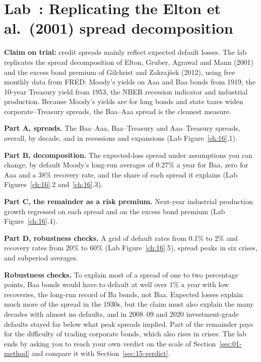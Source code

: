 \section{Lab~\thechapter: Replicating the Elton et al.\ (2001) spread decomposition}
\label{sec:15-lab}

\textbf{Claim on trial:} credit spreads mainly reflect expected default losses. The lab replicates the spread decomposition of Elton, Gruber, Agrawal and Mann (2001) and the excess bond premium of Gilchrist and Zakraj\v{s}ek (2012), using free monthly data from FRED: Moody's yields on Aaa and Baa bonds from 1919, the 10-year Treasury yield from 1953, the NBER recession indicator and industrial production. Because Moody's yields are for long bonds and state taxes widen corporate--Treasury spreads, the Baa--Aaa spread is the cleanest measure.

\textbf{Part A, spreads.} The Baa--Aaa, Baa--Treasury and Aaa--Treasury spreads, overall, by decade, and in recessions and expansions (Lab Figure~\ref{ch:16}.1).

\textbf{Part B, decomposition.} The expected-loss spread under assumptions you can change, by default Moody's long-run averages of 0.27\% a year for Baa, zero for Aaa and a 38\% recovery rate, and the share of each spread it explains (Lab Figures~\ref{ch:16}.2 and~\ref{ch:16}.3).

\textbf{Part C, the remainder as a risk premium.} Next-year industrial production growth regressed on each spread and on the excess bond premium (Lab Figure~\ref{ch:16}.4).

\textbf{Part D, robustness checks.} A grid of default rates from 0.1\% to 2\% and recovery rates from 20\% to 60\% (Lab Figure~\ref{ch:16}.5), spread peaks in six crises, and subperiod averages.

\label{sec:15-stress}
\textbf{Robustness checks.} To explain most of a spread of one to two percentage points, Baa bonds would have to default at well over 1\% a year with low recoveries, the long-run record of Ba bonds, not Baa. Expected losses explain much more of the spread in the 1930s, but the claim must also explain the many decades with almost no defaults, and in 2008--09 and 2020 investment-grade defaults stayed far below what peak spreads implied. Part of the remainder pays for the difficulty of trading corporate bonds, which also rises in crises. The lab ends by asking you to reach your own verdict on the scale of Section~\ref{sec:01-method} and compare it with Section~\ref{sec:15-verdict}.

